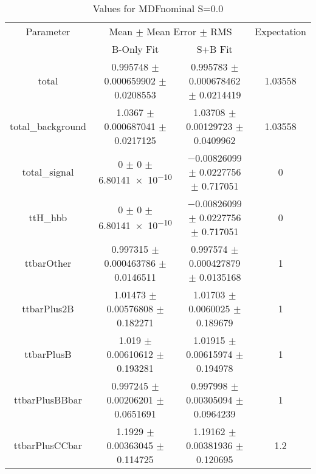 \begin{table}
\centering
\caption{Values for MDFnominal S=0.0}
\begin{tabular}{cccc}
\toprule
Parameter & \multicolumn{2}{c}{Mean $\pm$ Mean Error $\pm$ RMS} & Expectation\\
 & B-Only Fit & S+B Fit & \\
\midrule
total & \num{0.995748} $\pm$ \num{0.000659902} $\pm$ \num{0.0208553} & \num{0.995783} $\pm$ \num{0.000678462} $\pm$ \num{0.0214419} & \num{1.03558}\\
total\_background & \num{1.0367} $\pm$ \num{0.000687041} $\pm$ \num{0.0217125} & \num{1.03708} $\pm$ \num{0.00129723} $\pm$ \num{0.0409962} & \num{1.03558}\\
total\_signal & \num{0} $\pm$ \num{0} $\pm$ \num{6.80141e-10} & \num{-0.00826099} $\pm$ \num{0.0227756} $\pm$ \num{0.717051} & \num{0}\\
ttH\_hbb & \num{0} $\pm$ \num{0} $\pm$ \num{6.80141e-10} & \num{-0.00826099} $\pm$ \num{0.0227756} $\pm$ \num{0.717051} & \num{0}\\
ttbarOther & \num{0.997315} $\pm$ \num{0.000463786} $\pm$ \num{0.0146511} & \num{0.997574} $\pm$ \num{0.000427879} $\pm$ \num{0.0135168} & \num{1}\\
ttbarPlus2B & \num{1.01473} $\pm$ \num{0.00576808} $\pm$ \num{0.182271} & \num{1.01703} $\pm$ \num{0.0060025} $\pm$ \num{0.189679} & \num{1}\\
ttbarPlusB & \num{1.019} $\pm$ \num{0.00610612} $\pm$ \num{0.193281} & \num{1.01915} $\pm$ \num{0.00615974} $\pm$ \num{0.194978} & \num{1}\\
ttbarPlusBBbar & \num{0.997245} $\pm$ \num{0.00206201} $\pm$ \num{0.0651691} & \num{0.997998} $\pm$ \num{0.00305094} $\pm$ \num{0.0964239} & \num{1}\\
ttbarPlusCCbar & \num{1.1929} $\pm$ \num{0.00363045} $\pm$ \num{0.114725} & \num{1.19162} $\pm$ \num{0.00381936} $\pm$ \num{0.120695} & \num{1.2}\\
\bottomrule
\end{tabular}
\end{table}